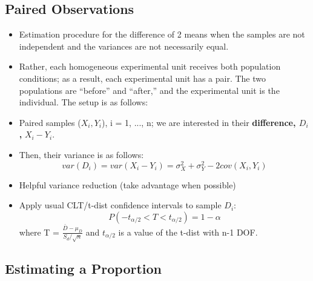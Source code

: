 \documentclass[10pt, letterpaper, twoside]{article}
\begin{document}
\begin{multicols}{2}
\subsection{Paired Observations}
\begin{itemize}
    \item Estimation procedure for the difference of 2 means when the samples are not independent and the variances are not necessarily equal.
    \item Rather, each homogeneous experimental unit receives both population conditions; as a result, each experimental unit has a pair. The two populations are “before” and “after,” and the experimental unit is the individual.
    The setup is as follows:
    \item Paired samples ($X_i, Y_i$), i = 1, ..., n; we are interested in their \textbf{difference, $D_i$,} $X_i - Y_i$.
    \item Then, their variance is as follows:
    \begin{equation*}
        var(D_i) = var(X_i - Y_i) = \sigma^2_X + \sigma^2_Y - 2cov(X_i,Y_i)
    \end{equation*}
    \item Helpful variance reduction (take advantage when possible)
    \item Apply usual CLT/t-dist confidence intervals to sample $D_i$:
    \begin{equation*}
        P(-t_{\alpha/2} < T < t_{\alpha/2}) = 1 - \alpha
    \end{equation*}
    where T = $\frac{\bar{D}-\mu_D}{S_d/\sqrt{n}}$ and $t_{\alpha/2}$ is a value of the t-dist with n-1 DOF.
\end{itemize}
\subsection{Estimating a Proportion}


\end{multicols}
\end{document}
